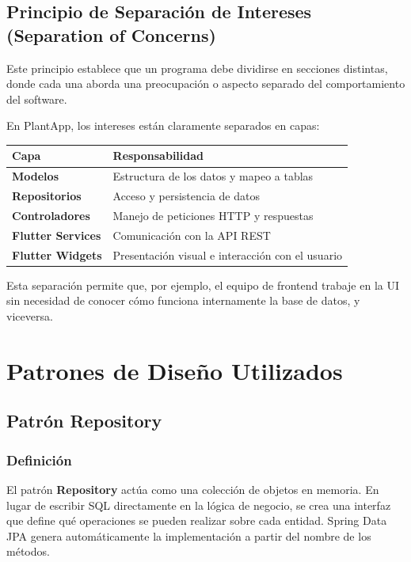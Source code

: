 \documentclass[12pt,a4paper]{article}
\begin{document}
\subsection{Principio de Separación de Intereses (Separation of Concerns)}

Este principio establece que un programa debe dividirse en secciones distintas, donde cada una aborda una preocupación o aspecto separado del comportamiento del software.

En PlantApp, los intereses están claramente separados en capas:

\begin{center}
\begin{tabular}{>{\bfseries}p{3.5cm} p{9cm}}
\toprule
Capa & Responsabilidad \\
\midrule
Modelos & Estructura de los datos y mapeo a tablas \\
Repositorios & Acceso y persistencia de datos \\
Controladores & Manejo de peticiones HTTP y respuestas \\
Flutter Services & Comunicación con la API REST \\
Flutter Widgets & Presentación visual e interacción con el usuario \\
\bottomrule
\end{tabular}
\end{center}

Esta separación permite que, por ejemplo, el equipo de frontend trabaje en la UI sin necesidad de conocer cómo funciona internamente la base de datos, y viceversa.


\section{Patrones de Diseño Utilizados}

\subsection{Patrón Repository}

\subsubsection{Definición}

El patrón \textbf{Repository} actúa como una colección de objetos en memoria. En lugar de escribir SQL directamente en la lógica de negocio, se crea una interfaz que define qué operaciones se pueden realizar sobre cada entidad. Spring Data JPA genera automáticamente la implementación a partir del nombre de los métodos.
\end{document}
